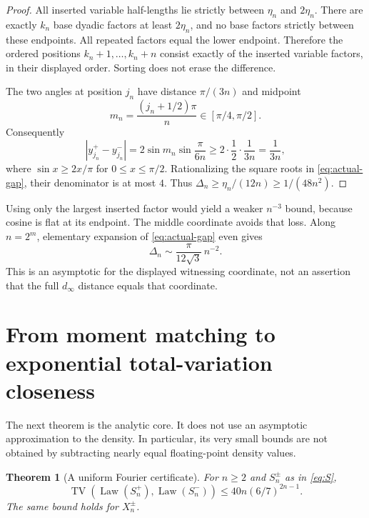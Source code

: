 \documentclass[11pt,a4paper]{article}
\newtheorem{theorem}{Theorem}[section]
\theoremstyle{definition}
\theoremstyle{remark}
\DeclareMathOperator{\TV}{TV}
\DeclareMathOperator{\Law}{Law}
\begin{document}
\begin{proof}
All inserted variable half-lengths lie strictly between $\eta_n$ and
$2\eta_n$. There are exactly $k_n$ base dyadic factors at least
$2\eta_n$, and no base factors strictly between these endpoints.
All repeated factors equal the lower endpoint. Therefore the ordered
positions $k_n+1,\ldots,k_n+n$ consist exactly of the inserted variable
factors, in their displayed order. Sorting does not erase the difference.

The two angles at position $j_n$ have distance $\pi/(3n)$ and midpoint
\[
 m_n=\frac{(j_n+1/2)\pi}{n}\in[\pi/4,\pi/2].
\]
Consequently
\[
 |y_{j_n}^+-y_{j_n}^-|
 =2\sin m_n\sin\frac{\pi}{6n}
 \ge 2\cdot\frac12\cdot\frac1{3n}
 =\frac1{3n},
\]
where $\sin x\ge2x/\pi$ for $0\le x\le\pi/2$. Rationalizing the square
roots in \eqref{eq:actual-gap}, their denominator is at most $4$.
Thus $\Delta_n\ge\eta_n/(12n)\ge1/(48n^2)$.
\end{proof}

Using only the largest inserted factor would yield a weaker $n^{-3}$
bound, because cosine is flat at its endpoint. The middle coordinate
avoids that loss. Along $n=2^m$, elementary expansion of
\eqref{eq:actual-gap} even gives
\[
 \Delta_n\sim\frac{\pi}{12\sqrt3}\,n^{-2}.
\]
This is an asymptotic for the displayed witnessing coordinate, not an
assertion that the full $d_\infty$ distance equals that coordinate.

\section{From moment matching to exponential total-variation closeness}
\label{sec:fourier}

The next theorem is the analytic core. It does not use an asymptotic
approximation to the density. In particular, its very small bounds are
not obtained by subtracting nearly equal floating-point density values.

\begin{theorem}[A uniform Fourier certificate]\label{thm:tv}
For $n\ge2$ and $S_n^\pm$ as in \eqref{eq:S},
\begin{equation}\label{eq:TV-S}
 \TV(\Law(S_n^+),\Law(S_n^-))
       \le40n(6/7)^{2n-1}.
\end{equation}
The same bound holds for $X_n^\pm$.
\end{theorem}
\end{document}

